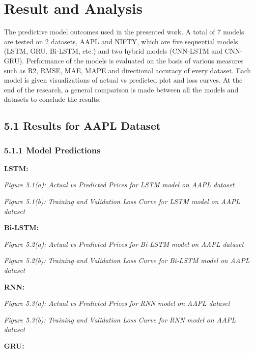 \documentclass[12pt,a4paper]{report}
\begin{document}
\chapter{Result and Analysis}
\label{ch:5}
The predictive model outcomes used in the presented work. A total of 7 models are tested on 2 datasets, AAPL and NIFTY, which are five sequential models (LSTM, GRU, Bi-LSTM, etc.) and two hybrid models (CNN-LSTM and CNN-GRU). Performance of the models is evaluated on the basis of various measures such as R2, RMSE, MAE, MAPE and directional accuracy of every dataset. Each model is given visualizations of actual vs predicted plot and loss curves. At the end of the research, a general comparison is made between all the models and datasets to conclude the results.

\section{5.1 Results for AAPL Dataset}
\subsection{5.1.1 Model Predictions}
\textbf{LSTM:}

\begin{center}
\textit{Figure 5.1}\textit{(}\textit{a}\textit{)}\textit{: Actual vs Predicted Prices for LSTM model on AAPL dataset}
\end{center}
\begin{center}
\textit{Figure 5.1}\textit{(}\textit{b}\textit{)}\textit{: Training and Validation Loss Curve for LSTM model on AAPL dataset}
\end{center}
\textbf{Bi-LSTM:}

\begin{center}
\textit{Figure 5.2(a): Actual vs Predicted Prices for Bi-LSTM model on AAPL dataset}
\end{center}
\begin{center}
\textit{Figure 5.2(b): Training and Validation Loss Curve for Bi-LSTM model on AAPL dataset}
\end{center}
\textbf{RNN:}

\begin{center}
\textit{Figure 5.3(a): Actual vs Predicted Prices for }\textit{RNN}\textit{ }\textit{model on AAPL dataset}
\end{center}
\begin{center}
\textit{Figure 5.3(b): Training and Validation Loss Curve for }\textit{RNN}\textit{ model on AAPL dataset}
\end{center}
\textbf{GRU:}
\end{document}
